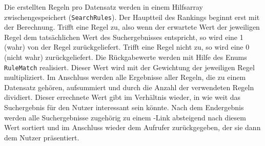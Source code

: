 Die erstellten Regeln pro Datensatz werden in einem Hilfsarray zwischengespeichert (\lstinline|SearchRules|). Der Hauptteil des Rankings beginnt erst mit der Berechnung. Trifft eine Regel zu, also wenn der erwartete Wert der jeweiligen Regel dem tatsächlichen Wert des Suchergebnisses entspricht, so wird eine 1 (wahr) von der Regel zurückgeliefert. Trifft eine Regel nicht zu, so wird eine 0 (nicht wahr) zurückgeliefert. Die Rückgabewerte werden mit Hilfe des Enums \lstinline|RuleMatch| realisiert. Dieser Wert wird mit der Gewichtung der jeweiligen Regel multipliziert. Im Anschluss werden alle Ergebnisse aller Regeln, die zu einem Datensatz gehören, aufsummiert und durch die Anzahl der verwendeten Regeln dividiert. Dieser errechnete Wert gibt im Verhältnis wieder, in wie weit das Suchergebnis für den Nutzer interessant sein könnte. Nach dem Endergebnis werden alle Suchergebnisse zugehörig zu einem \SEARCH-Link absteigend nach diesem Wert sortiert und im Anschluss wieder dem Aufrufer zurückgegeben, der sie dann dem Nutzer präsentiert.